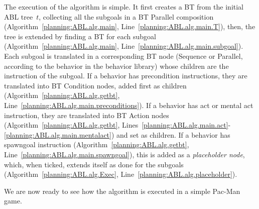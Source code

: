 The execution of the algorithm is simple. It first creates a BT from the initial ABL tree~$t$, collecting all the subgoals in a BT Parallel composition (Algorithm~\ref{planning:ABL.alg.main}, Line~\ref{planning:ABL.alg.main.T}), then, the tree is extended by finding a BT for each subgoal (Algorithm~\ref{planning:ABL.alg.main}, Line~\ref{planning:ABL.alg.main.subgoal}). Each subgoal is translated in a corresponding BT node (Sequence or Parallel, according to the behavior in the behavior library) whose children are the instruction of the subgoal. If a behavior has precondition instructions, they are translated into BT Condition nodes, added first as children (Algorithm~\ref{planning:ABL.alg.getbt}, Line~\ref{planning:ABL.alg.main.preconditions}). If a behavior has act or mental act instruction, they are translated into BT Action nodes (Algorithm~\ref{planning:ABL.alg.getbt}, Lines~\ref{planning:ABL.alg.main.act}-\ref{planning:ABL.alg.main.mentalact}) and set as children. If a behavior has spawngoal instruction (Algorithm~\ref{planning:ABL.alg.getbt}, Line~\ref{planning:ABL.alg.main.spawngoal}), this is added as a \emph{placeholder node}, which, when ticked, extends itself as done for the subgoals (Algorithm~\ref{planning:ABL.alg.Exec}, Line~\ref{planning:ABL.alg.placeholder}). 


We are now ready to see how the algorithm is executed in a simple Pac-Man game.

